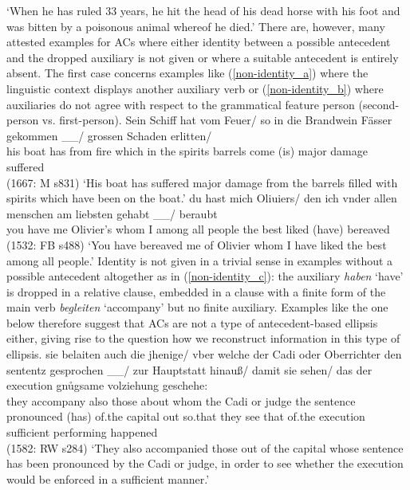\documentclass[output=paper,colorlinks,citecolor=brown]{langscibook}
\begin{document}
\glt `When he has ruled 33 years, he hit the head of his dead horse with his foot and was bitten by a poisonous animal whereof he died.'
\z
There are, however, many attested examples for ACs where either identity between a possible antecedent and the dropped auxiliary is not given or where a suitable antecedent is entirely absent. The first case concerns examples like (\ref{non-identity_a}) where the linguistic context displays another auxiliary verb or (\ref{non-identity_b}) where auxiliaries do not agree with respect to the grammatical feature person (second-person vs. first-person). 
\eal
\ex \label{non-identity_a}
\gll Sein Schiff hat vom Feuer/ so in die Brandwein Fässer gekommen \_\_/ grossen Schaden erlitten/ \\ his boat has from fire which in the spirits barrels come (is) major damage suffered \\ \hfill (1667: M s831)
\glt `His boat has suffered major damage from the barrels filled with spirits which have been on the boat.'
\ex \label{non-identity_b}
\gll du hast mich Oliuiers/ den ich vnder allen menschen am liebsten gehabt \_\_/ beraubt \\ you have me Olivier's whom I among all people the best liked (have) bereaved \\ \hfill (1532: FB s488) 
\glt `You have bereaved me of Olivier whom I have liked the best among all people.'
\zl
Identity is not given in a trivial sense in examples without a possible antecedent altogether as in (\ref{non-identity_c}): the auxiliary \textit{haben} `have' is dropped in a relative clause, embedded in a clause with a finite form of the main verb \textit{begleiten} `accompany' but no finite auxiliary. Examples like the one below therefore suggest that ACs are not a type of antecedent-based ellipsis either, giving rise to the question how we reconstruct information in this type of ellipsis.
\ea \label{non-identity_c}
\gll sie belaiten auch {die jhenige}/ vber welche der Cadi oder Oberrichter den sententz gesprochen
\_\_/ zur Hauptstatt hinauß/ damit sie sehen/ das der execution gn\r{u}gsame volziehung geschehe: \\
they accompany also those about whom the Cadi or judge the sentence pronounced (has) of.the capital out so.that they see that of.the execution sufficient performing happened    \\ \hfill (1582: RW s284)
\glt `They also accompanied those out of the capital whose sentence has been pronounced by the Cadi or judge, in order to see whether the execution would be enforced in a sufficient manner.'
\end{document}

